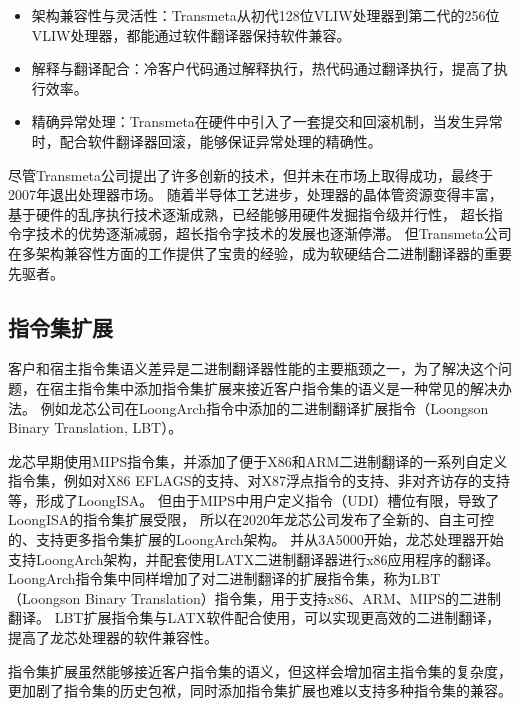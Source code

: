 \begin{itemize}
\item 架构兼容性与灵活性：Transmeta从初代128位VLIW处理器到第二代的256位VLIW处理器，都能通过软件翻译器保持软件兼容。
\item 解释与翻译配合：冷客户代码通过解释执行，热代码通过翻译执行，提高了执行效率。
\item 精确异常处理：Transmeta在硬件中引入了一套提交和回滚机制，当发生异常时，配合软件翻译器回滚，能够保证异常处理的精确性。
\end{itemize}

尽管Transmeta公司提出了许多创新的技术，但并未在市场上取得成功，最终于2007年退出处理器市场。
随着半导体工艺进步，处理器的晶体管资源变得丰富，基于硬件的乱序执行技术逐渐成熟，已经能够用硬件发掘指令级并行性，
超长指令字技术的优势逐渐减弱，超长指令字技术的发展也逐渐停滞。
但Transmeta公司在多架构兼容性方面的工作提供了宝贵的经验，成为软硬结合二进制翻译器的重要先驱者。

\subsection{指令集扩展}\label{sec:isa_extension}

客户和宿主指令集语义差异是二进制翻译器性能的主要瓶颈之一，为了解决这个问题，在宿主指令集中添加指令集扩展来接近客户指令集的语义是一种常见的解决办法。
例如龙芯公司在LoongArch指令中添加的二进制翻译扩展指令（Loongson Binary Translation, LBT）\cite{LoongArch2023}。

龙芯早期使用MIPS指令集，并添加了便于X86和ARM二进制翻译的一系列自定义指令集，例如对X86 EFLAGS的支持、对X87浮点指令的支持、非对齐访存的支持等，形成了LoongISA\cite{LoongISA}。
但由于MIPS中用户定义指令（UDI）槽位有限，导致了LoongISA的指令集扩展受限，
所以在2020年龙芯公司发布了全新的、自主可控的、支持更多指令集扩展的LoongArch架构\cite{LoongArch2023}。
并从3A5000开始，龙芯处理器开始支持LoongArch架构，并配套使用LATX二进制翻译器进行x86应用程序的翻译。
LoongArch指令集中同样增加了对二进制翻译的扩展指令集，称为LBT（Loongson Binary Translation）指令集，用于支持x86、ARM、MIPS的二进制翻译。
LBT扩展指令集与LATX软件配合使用，可以实现更高效的二进制翻译，提高了龙芯处理器的软件兼容性。

指令集扩展虽然能够接近客户指令集的语义，但这样会增加宿主指令集的复杂度，更加剧了指令集的历史包袱，同时添加指令集扩展也难以支持多种指令集的兼容。



